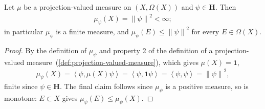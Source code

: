 \begin{lemma}
    \label{lmm:associated-measure-total-mass}
    \leanok
    Let $\mu$ be a projection-valued measure on $(X,\Omega(X))$ and $\psi \in \mathbf{H}$. Then
    \begin{align}
        \mu_\psi(X) = \left\| \psi \right\|^2 < \infty;
    \end{align}
    in particular $\mu_\psi$ is a finite measure, and $\mu_\psi(E) \le \left\| \psi \right\|^2$ for every $E \in \Omega(X)$.
\end{lemma}
\begin{proof}
    \leanok
By the definition of $\mu_\psi$ and property 2 of the definition of a projection-valued measure~(\ref{def:projection-valued-measure}), which gives $\mu(X) = \mathbf{1}$,
\begin{align}
    \mu_\psi(X) = \left< \psi, \mu(X)\psi \right> = \left< \psi, \mathbf{1}\psi \right> = \left< \psi,\psi \right> = \left\| \psi \right\|^2,
\end{align}
finite since $\psi \in \mathbf{H}$. The final claim follows since $\mu_\psi$ is a positive measure, so is monotone: $E \subset X$ gives $\mu_\psi(E) \le \mu_\psi(X)$.
\end{proof}

